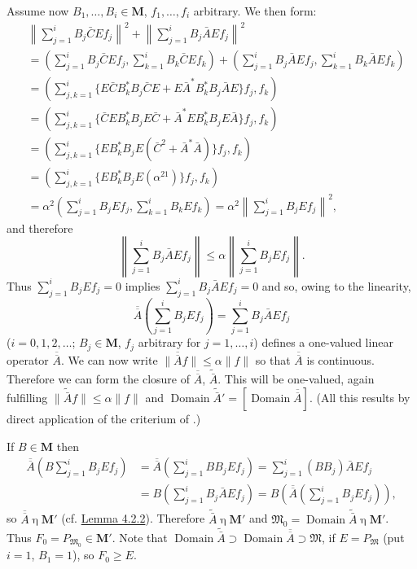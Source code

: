 \documentclass[12pt,b5paper,twoside]{article}
\newcommand{\M}{\mathbf M}
\newcommand{\lemref}[1]{\hyperref[lem:#1]{Lemma #1}}
\begin{document}
Assume now $B_1,\ldots,B_i\in\M$, $f_1,\ldots,f_i$ arbitrary. We then
form:
\begin{align*}
 &\left\lVert\sum_{j=1}^{i}B_j\bar C E f_j\right\rVert^2
 +\left\lVert\sum_{j=1}^{i}B_j\bar A E f_j\right\rVert^2\\
 &=\left(\sum_{j=1}^{i}B_j\bar C E f_j,
          \sum_{k=1}^{i}B_k\bar C E f_k\right)
  +\left(\sum_{j=1}^{i}B_j\bar A E f_j,
          \sum_{k=1}^{i}B_k\bar A E f_k\right)\\
 &=\left(\sum_{j,k=1}^{i}
    \{E\bar C B_k^*B_j\bar C E+E\bar A^*B_k^*B_j\bar A E\}f_j,f_k\right)\\
 &=\left(\sum_{j,k=1}^{i}
    \{\bar CEB_k^*B_jE\bar C+\bar A^*EB_k^*B_jE\bar A\}f_j,f_k\right)\\
 &=\left(\sum_{j,k=1}^{i}
    \{EB_k^*B_jE(\bar C^2+\bar A^*\bar A)\}f_j,f_k\right)\\
 &=\left(\sum_{j,k=1}^{i}\{EB_k^*B_jE(\alpha^21)\}f_j,f_k\right)\\
 &=\alpha^2\left(\sum_{j=1}^{i}B_jEf_j,
                  \sum_{k=1}^{i}B_kEf_k\right)
 =\alpha^2\left\lVert\sum_{j=1}^{i}B_jEf_j\right\rVert^2,
\end{align*}
and therefore
\[
 \left\lVert\sum_{j=1}^{i}B_j\bar A E f_j\right\rVert
 \leq\alpha\left\lVert\sum_{j=1}^{i}B_jE f_j\right\rVert.
\]
Thus $\sum_{j=1}^{i}B_jEf_j=0$ implies
$\sum_{j=1}^{i}B_j\bar A Ef_j=0$ and so, owing to the linearity,
\[
 \overline{\overline A}\left(\sum_{j=1}^{i}B_jEf_j\right)
 =\sum_{j=1}^{i}B_j\bar A Ef_j
\]
($i=0,1,2,\ldots$; $B_j\in\M$, $f_j$ arbitrary for $j=1,\ldots,i$)
defines a one-valued linear operator $\overline{\overline A}$. We can now
write $\lVert\overline{\overline A}f\rVert\leq\alpha\lVert f\rVert$ so
that $\overline{\overline A}$ is continuous. Therefore we can form the
closure of $\overline{\overline A}$, $\widetilde{\bar A}$. This will be
one-valued, again fulfilling
$\lVert\widetilde{\bar A}f\rVert\leq\alpha\lVert f\rVert$ and
 $\operatorname{Domain}\widetilde{\bar A}'
=[\operatorname{Domain}\overline{\overline A}]$. (All this results by
direct application of the criterium of \cite[p.~300]{ref21}.)

If $B\in\M$ then
\begin{align*}
 \overline{\overline A}\left(B\sum_{j=1}^{i}B_jEf_j\right)
 &=\overline{\overline A}\left(\sum_{j=1}^{i}BB_jEf_j\right)
 =\sum_{j=1}^{i}(BB_j)\bar A Ef_j\\
 &=B\left(\sum_{j=1}^{i}B_j\bar A Ef_j\right)
 =B\left(\overline{\overline A}
           \left(\sum_{j=1}^{i}B_jEf_j\right)\right),
\end{align*}
so $\overline{\overline A}\mathbin\eta\M'$ (cf. \lemref{4.2.2}).
Therefore $\widetilde{\bar A}\mathbin\eta\M'$ and
$\mathfrak M_0=\operatorname{Domain}\widetilde{\bar A}
\mathbin\eta\M'$. Thus $F_0=P_{\mathfrak M_0}\in\M'$. Note that
$\operatorname{Domain}\widetilde{\bar A}\supset
\operatorname{Domain}\overline{\overline A}\supset\mathfrak M$, if
$E=P_{\mathfrak M}$ (put $i=1$, $B_1=1$), so $F_0\geq E$.
\end{document}
